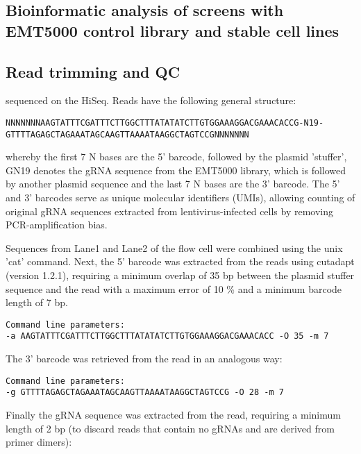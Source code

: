 \begin{footnotesize}

\section{Bioinformatic analysis of screens with EMT5000 control library and stable cell lines}
\label{sec:Bioinformatic analysis of screens with EMT5000 control library and stable cell lines}

\subsection{Read trimming and QC}

sequenced on the HiSeq. Reads have the following general structure:
\begin{lstlisting}
NNNNNNNAAGTATTTCGATTTCTTGGCTTTATATATCTTGTGGAAAGGACGAAACACCG-N19-GTTTTAGAGCTAGAAATAGCAAGTTAAAATAAGGCTAGTCCGNNNNNNN
\end{lstlisting}

whereby the first 7 N bases are the 5' barcode, followed by the plasmid 'stuffer',  GN19 denotes the gRNA sequence from the EMT5000 library, which is followed by another plasmid sequence and the last 7 N bases are the 3' barcode. The 5' and 3' barcodes serve as unique molecular identifiers (UMIs), allowing counting of original gRNA sequences extracted from lentivirus-infected cells by removing PCR-amplification bias.

Sequences from Lane1 and Lane2 of the flow cell were combined using the unix 'cat' command. Next, the 5' barcode was extracted from the reads using cutadapt (version 1.2.1), requiring a minimum overlap of 35 bp between the plasmid stuffer sequence and the read with a maximum error of 10 \% and a minimum barcode length of 7 bp.

\begin{lstlisting}
Command line parameters:
-a AAGTATTTCGATTTCTTGGCTTTATATATCTTGTGGAAAGGACGAAACACC -O 35 -m 7 
\end{lstlisting}

The 3' barcode was retrieved from the read in an analogous way:

\begin{lstlisting}
Command line parameters:
-g GTTTTAGAGCTAGAAATAGCAAGTTAAAATAAGGCTAGTCCG -O 28 -m 7
\end{lstlisting}

Finally the gRNA sequence was extracted from the read, requiring a minimum length of 2 bp (to discard reads that contain no gRNAs and are derived from primer dimers):


\end{footnotesize}
